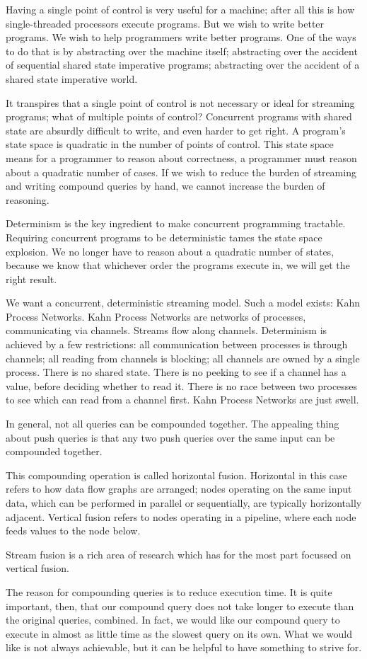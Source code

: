 Having a single point of control is very useful for a machine; after all this is how single-threaded processors execute programs.
But we wish to write better programs.
We wish to help programmers write better programs.
One of the ways to do that is by abstracting over the machine itself; abstracting over the accident of sequential shared state imperative programs; abstracting over the accident of a shared state imperative world.

It transpires that a single point of control is not necessary or ideal for streaming programs; what of multiple points of control?
Concurrent programs with shared state are absurdly difficult to write, and even harder to get right.
A program's state space is quadratic in the number of points of control.
This state space means for a programmer to reason about correctness, a programmer must reason about a quadratic number of cases.
If we wish to reduce the burden of streaming and writing compound queries by hand, we cannot increase the burden of reasoning.

Determinism is the key ingredient to make concurrent programming tractable.
Requiring concurrent programs to be deterministic tames the state space explosion.
We no longer have to reason about a quadratic number of states, because we know that whichever order the programs execute in, we will get the right result.

We want a concurrent, deterministic streaming model.
Such a model exists: Kahn Process Networks.
Kahn Process Networks are networks of processes, communicating via channels.
Streams flow along channels.
Determinism is achieved by a few restrictions: all communication between processes is through channels; all reading from channels is blocking; all channels are owned by a single process.
There is no shared state.
There is no peeking to see if a channel has a value, before deciding whether to read it.
There is no race between two processes to see which can read from a channel first.
Kahn Process Networks are just swell.



In general, not all queries can be compounded together.
The appealing thing about push queries is that any two push queries over the same input can be compounded together.

This compounding operation is called horizontal fusion.
Horizontal in this case refers to how data flow graphs are arranged; nodes operating on the same input data, which can be performed in parallel or sequentially, are typically horizontally adjacent.
Vertical fusion refers to nodes operating in a pipeline, where each node feeds values to the node below.

Stream fusion is a rich area of research which has for the most part focussed on vertical fusion.

The reason for compounding queries is to reduce execution time.
It is quite important, then, that our compound query does not take longer to execute than the original queries, combined.
In fact, we would like our compound query to execute in almost as little time as the slowest query on its own.
What we would like is not always achievable, but it can be helpful to have something to strive for.



